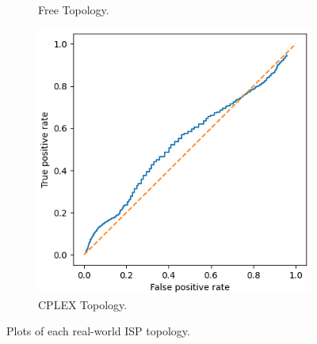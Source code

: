 \begin{figure}[H]
\begin{subfigure}{0.475\textwidth}
        \caption{Free Topology.}
    \end{subfigure}
    \begin{subfigure}{0.475\textwidth}
        \includegraphics[width=\textwidth]{figs/results/norway_case2_roc.png}
        \caption{CPLEX Topology.}
    \end{subfigure}
    \caption{Plots of each real-world ISP topology.}
    \label{fig:MISPplots}
\end{figure}

